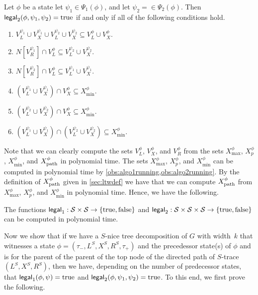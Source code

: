 \documentclass[a4paper,UKenglish,cleveref, autoref, thm-restate, numberwithinsect]{lipics-v2021}
\newcommand{\legal}{\mathsf{legal}}
\newcommand{\dpath}{\textup{path}}
\newcommand{\true}{\textup{true}}
\newcommand{\false}{\textup{false}}
\newcommand{\slim}{\text{slim}\xspace}
\newcommand{\topheavy}{\text{top-heavy}\xspace}
\begin{document}
\begin{definition}[$\legal_2$]\label{def:legal2}
Let $\phi$ be a state let $\psi_1\in\Psi_1(\phi)$, and let $\psi_2=\in\Psi_2(\phi)$.
Then $\legal_2(\phi,\psi_1,\psi_2)=\true$ if and only if all of the following conditions hold.
\begin{enumerate}
\item $V^{\psi_1}_L\cup V^{\psi_1}_X\cup V^{\psi_2}_L\cup V^{\psi_2}_X \subseteq V^\phi_L\cup V^\phi_X$.
\item $N[V^{\psi_1}_R]\cap V^\phi_L\subseteq V^{\psi_2}_L\cup V^{\psi_2}_X$.
\item $N[V^{\psi_2}_R]\cap V^\phi_L\subseteq V^{\psi_1}_L\cup V^{\psi_1}_X$.
\item $(V^{\psi_1}_L\cup V^{\psi_1}_X)\cap V^\phi_X\subseteq X^\phi_{\min}$.
\item $(V^{\psi_2}_L\cup V^{\psi_2}_X)\cap V^\phi_X\subseteq X^\phi_{\min}$.
\item $(V^{\psi_1}_L\cup V^{\psi_1}_X)\cap (V^{\psi_2}_L\cup V^{\psi_2}_X)\subseteq X^\phi_{\min}$.
\end{enumerate}
\end{definition}

Note that we can clearly compute the sets $V^\phi_L$, $V^\phi_X$, and $V^\phi_R$ from the sets  $X^\phi_{\max}$, $X^\phi_p$, $X^\phi_{\min}$, and $X^\phi_{\dpath}$ in polynomial time. The sets $X^\phi_{\max}$, $X^\phi_p$, and $X^\phi_{\min}$ can be computed in polynomial time by \cref{obs:algo1running,obs:algo2running}. By the definition of $X^\phi_{\dpath}$ given in \cref{sec:ltwdef} we have that we can compute $X^\phi_{\dpath}$ from $X^\phi_{\max}$, $X^\phi_p$, and $X^\phi_{\min}$ in polynomial time. Hence, we have the following.

\begin{observation}\label{obs:legalpoly}
The functions $\legal_1:\mathcal{S}\times \mathcal{S}\rightarrow \{\true,\false\}$ and $\legal_2:\mathcal{S}\times \mathcal{S}\times \mathcal{S}\rightarrow \{\true,\false\}$ can be computed in polynomial time.
\end{observation}

Now we show that if we have a \slim $S$-nice tree decomposition of $G$ with width~$k$ that witnesses a state $\phi=(\tau_-,L^S, X^S, R^S,\tau_+)$ and the precedessor state(s) of $\phi$ and is \topheavy for the parent of the parent of the top node of the directed path of $S$-trace $(L^S, X^S, R^S)$, then we have, depending on the number of predecessor states, that $\legal_1(\phi,\psi)=\true$ and $\legal_2(\phi,\psi_1,\psi_2)=\true$.
To this end, we first prove the following.
\end{document}
